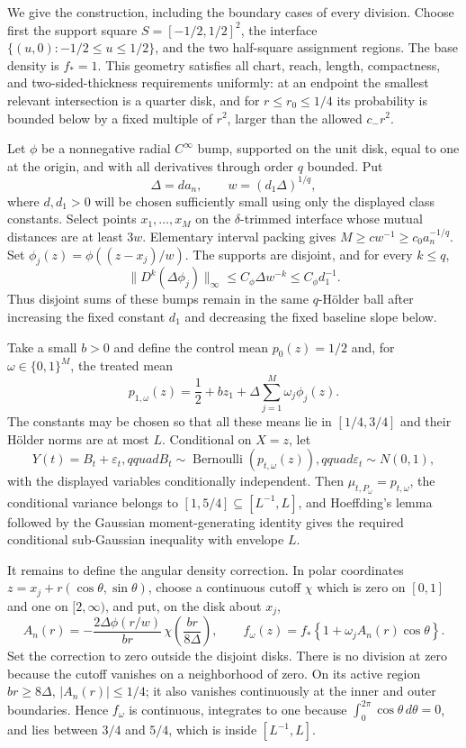 We give the construction, including the boundary cases of every division.  Choose first the support square \(S=[-1/2,1/2]^2\), the interface \(\{(u,0):-1/2\leq u\leq1/2\}\), and the two half-square assignment regions.  The base density is \(f_*=1\).  This geometry satisfies all chart, reach, length, compactness, and two-sided-thickness requirements uniformly: at an endpoint the smallest relevant intersection is a quarter disk, and for \(r\leq r_0\leq1/4\) its probability is bounded below by a fixed multiple of \(r^2\), larger than the allowed \(c_-r^2\).

Let \(\phi\) be a nonnegative radial \(C^\infty\) bump, supported on the unit disk, equal to one at the origin, and with all derivatives through order \(q\) bounded.  Put
\[
 \Delta=d a_n,\qquad w=(d_1\Delta)^{1/q},
\]
where \(d,d_1>0\) will be chosen sufficiently small using only the displayed class constants.  Select points \(x_1,\ldots,x_M\) on the \(\delta\)-trimmed interface whose mutual distances are at least \(3w\).  Elementary interval packing gives \(M\geq c w^{-1}\geq c_0a_n^{-1/q}\).  Set \(\phi_j(z)=\phi((z-x_j)/w)\).  The supports are disjoint, and for every \(k\leq q\),
\[
 \lVert D^k(\Delta\phi_j)\rVert_\infty
 \leq C_\phi\Delta w^{-k}
 \leq C_\phi d_1^{-1}.
\]
Thus disjoint sums of these bumps remain in the same \(q\)-H\"older ball after increasing the fixed constant \(d_1\) and decreasing the fixed baseline slope below.

Take a small \(b>0\) and define the control mean \(p_0(z)=1/2\) and, for \(\omega\in\{0,1\}^M\), the treated mean
\[
 p_{1,\omega}(z)=\frac12+bz_1+\Delta\sum_{j=1}^M\omega_j\phi_j(z).
\]
The constants may be chosen so that all these means lie in \([1/4,3/4]\) and their H\"older norms are at most \(L\).  Conditional on \(X=z\), let
\[
 Y(t)=B_t+\varepsilon_t,qquad B_t\sim\operatorname{Bernoulli}(p_{t,\omega}(z)),qquad
 \varepsilon_t\sim N(0,1),
\]
with the displayed variables conditionally independent.  Then \(\mu_{t,P_\omega}=p_{t,\omega}\), the conditional variance belongs to \([1,5/4]\subseteq[L^{-1},L]\), and Hoeffding's lemma followed by the Gaussian moment-generating identity gives the required conditional sub-Gaussian inequality with envelope \(L\).

It remains to define the angular density correction.  In polar coordinates \(z=x_j+r(\cos\theta,\sin\theta)\), choose a continuous cutoff \(\chi\) which is zero on \([0,1]\) and one on \([2,\infty)\), and put, on the disk about \(x_j\),
\[
 A_n(r)=-\frac{2\Delta\phi(r/w)}{br}\,\chi\!\left(\frac{br}{8\Delta}\right),
 \qquad
 f_\omega(z)=f_*\left\{1+\omega_jA_n(r)\cos\theta\right\}.
\]
Set the correction to zero outside the disjoint disks.  There is no division at zero because the cutoff vanishes on a neighborhood of zero.  On its active region \(br\geq8\Delta\), \(|A_n(r)|\leq1/4\); it also vanishes continuously at the inner and outer boundaries.  Hence \(f_\omega\) is continuous, integrates to one because \(\int_0^{2\pi}\cos\theta\,d\theta=0\), and lies between \(3/4\) and \(5/4\), which is inside \([L^{-1},L]\).

